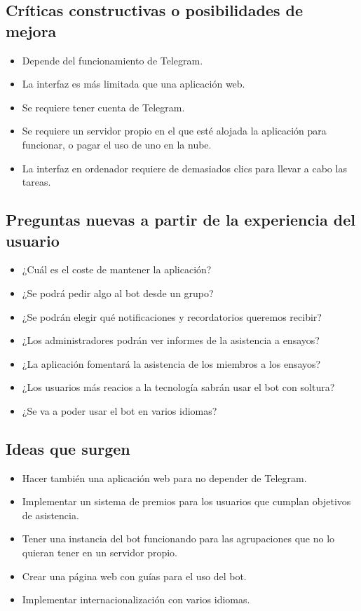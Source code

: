 \subsection{Críticas constructivas o posibilidades de mejora}

\begin{itemize}
    \item Depende del funcionamiento de Telegram.
    \item La interfaz es más limitada que una aplicación web.
    \item Se requiere tener cuenta de Telegram.
    \item Se requiere un servidor propio en el que esté alojada la aplicación para funcionar, o pagar el uso de uno en la nube.
    \item La interfaz en ordenador requiere de demasiados clics para llevar a cabo las tareas.
\end{itemize}

\subsection{Preguntas nuevas a partir de la experiencia del usuario}

\begin{itemize}
    \item ¿Cuál es el coste de mantener la aplicación?
    \item ¿Se podrá pedir algo al bot desde un grupo?
    \item ¿Se podrán elegir qué notificaciones y recordatorios queremos recibir?
    \item ¿Los administradores podrán ver informes de la asistencia a ensayos?
    \item ¿La aplicación fomentará la asistencia de los miembros a los ensayos?
    \item ¿Los usuarios más reacios a la tecnología sabrán usar el bot con soltura?
    \item ¿Se va a poder usar el bot en varios idiomas?
\end{itemize}

\subsection{Ideas que surgen}

\begin{itemize}
    \item Hacer también una aplicación web para no depender de Telegram.
    \item Implementar un sistema de premios para los usuarios que cumplan objetivos de asistencia.
    \item Tener una instancia del bot funcionando para las agrupaciones que no lo quieran tener en un servidor propio.
    \item Crear una página web con guías para el uso del bot.
    \item Implementar internacionalización con varios idiomas.
\end{itemize}

